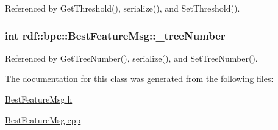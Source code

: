 Referenced by Get\+Threshold(), serialize(), and Set\+Threshold().

\subsubsection[{\texorpdfstring{\+\_\+tree\+Number}{_treeNumber}}]{\setlength{\rightskip}{0pt plus 5cm}int rdf\+::bpc\+::\+Best\+Feature\+Msg\+::\+\_\+tree\+Number\hspace{0.3cm}{\ttfamily [private]}}\hypertarget{classrdf_1_1bpc_1_1BestFeatureMsg_a6d8b8a53e1baf9a008e0320839002728}{}\label{classrdf_1_1bpc_1_1BestFeatureMsg_a6d8b8a53e1baf9a008e0320839002728}


Referenced by Get\+Tree\+Number(), serialize(), and Set\+Tree\+Number().



The documentation for this class was generated from the following files\+:\begin{DoxyCompactItemize}
\item 
\hyperlink{BestFeatureMsg_8h}{Best\+Feature\+Msg.\+h}\item 
\hyperlink{BestFeatureMsg_8cpp}{Best\+Feature\+Msg.\+cpp}\end{DoxyCompactItemize}
